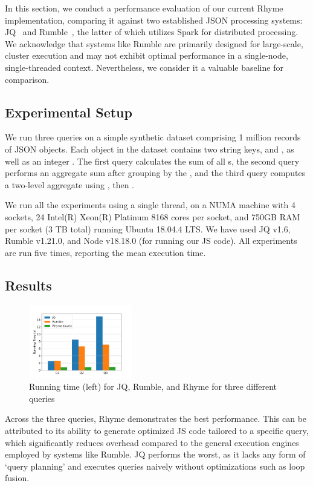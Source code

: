 \documentclass[runningheads]{llncs}
\newcommand{\lang}{Rhyme}
\begin{document}
In this section, we conduct a performance evaluation of our current \lang{}
implementation, comparing it against two established JSON processing
systems: JQ~\cite{jq} and Rumble~\cite{rumble_vldb}, the latter of which
utilizes Spark for distributed processing.
We acknowledge that systems like Rumble are primarily designed for large-scale,
cluster execution and may not exhibit optimal performance in a single-node,
single-threaded context.
Nevertheless, we consider it a valuable baseline for comparison.

\vspace{-4mm}
\subsection{Experimental Setup}
We run three queries on a simple synthetic dataset comprising 1 million records of
JSON objects.
Each object in the dataset contains two string keys,  and , 
as well as an integer .
The first query calculates the sum of all s, the second query performs
an aggregate sum after grouping by the ,
and the third query computes a two-level aggregate using , then .

We run all the experiments using a single thread, on a NUMA machine
with 4 sockets, 24 Intel(R) Xeon(R) Platinum 8168 cores
per socket, and 750GB RAM per socket (3 TB total) running Ubuntu
18.04.4 LTS.
We have used JQ v1.6, Rumble v1.21.0, and Node v18.18.0 (for running our JS code).
All experiments are run five times, reporting the mean execution time.

\vspace{-4mm}
\subsection{Results}
\begin{figure}
\vspace{-30pt}
\centering
\includegraphics[width=0.4\textwidth,clip,trim={7mm 7mm 17mm 12mm}]{images/plot.pdf}
\caption{Running time (left) for JQ, Rumble, and Rhyme for three different queries}\label{fig:plot}
\vspace{-20pt}
\end{figure} 
Across the three queries, \lang{} demonstrates the best performance.
This can be attributed to its ability to generate optimized JS code tailored
to a specific query, which significantly reduces overhead compared to the
general execution engines employed by systems like Rumble.
JQ performs the worst, as it lacks any form of
`query planning' and executes queries naively without optimizations
such as loop fusion.
\end{document}
